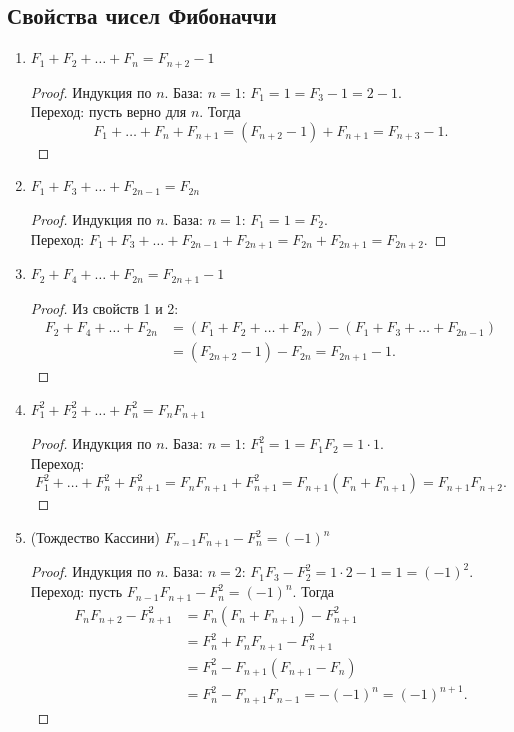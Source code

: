 \documentclass[12pt]{article}
\begin{document}
	\subsection{Свойства чисел Фибоначчи}
	
	\begin{enumerate}
		\item $F_1 + F_2 + \dots + F_n = F_{n + 2} - 1$
		
		\begin{proof}
			Индукция по $n$. База: $n = 1$: $F_1 = 1 = F_3 - 1 = 2 - 1$. \\
			Переход: пусть верно для $n$. Тогда
			\[F_1 + \dots + F_n + F_{n+1} = (F_{n+2} - 1) + F_{n+1} = F_{n+3} - 1.\]
		\end{proof}
		
		\item $F_1 + F_3 + \dots + F_{2n - 1} = F_{2n}$
		
		\begin{proof}
			Индукция по $n$. База: $n = 1$: $F_1 = 1 = F_2$. \\
			Переход: $F_1 + F_3 + \dots + F_{2n-1} + F_{2n+1} = F_{2n} + F_{2n+1} = F_{2n+2}$.
		\end{proof}
		
		\item $F_2 + F_4 + \dots + F_{2n} = F_{2n + 1} - 1$
		
		\begin{proof}
			Из свойств 1 и 2: 
			\begin{align*}
				F_2 + F_4 + \dots + F_{2n} &= (F_1 + F_2 + \dots + F_{2n}) - (F_1 + F_3 + \dots + F_{2n-1}) \\
				&= (F_{2n+2} - 1) - F_{2n} = F_{2n+1} - 1.
			\end{align*}
		\end{proof}
		
		\item $F_1^2 + F_2^2 + \dots + F_n^2 = F_n F_{n + 1}$
		
		\begin{proof}
			Индукция по $n$. База: $n = 1$: $F_1^2 = 1 = F_1 F_2 = 1 \cdot 1$. \\
			Переход: 
			\[F_1^2 + \dots + F_n^2 + F_{n+1}^2 = F_n F_{n+1} + F_{n+1}^2 = F_{n+1}(F_n + F_{n+1}) = F_{n+1} F_{n+2}.\]
		\end{proof}
		
		\item (Тождество Кассини) $F_{n - 1} F_{n + 1} - F_n^2 = (-1)^n$
		
		\begin{proof}
			Индукция по $n$. База: $n = 2$: $F_1 F_3 - F_2^2 = 1 \cdot 2 - 1 = 1 = (-1)^2$. \\
			Переход: пусть $F_{n-1} F_{n+1} - F_n^2 = (-1)^n$. Тогда
			\begin{align*}
				F_n F_{n+2} - F_{n+1}^2 &= F_n(F_n + F_{n+1}) - F_{n+1}^2 \\
				&= F_n^2 + F_n F_{n+1} - F_{n+1}^2 \\
				&= F_n^2 - F_{n+1}(F_{n+1} - F_n) \\
				&= F_n^2 - F_{n+1} F_{n-1} = -(-1)^n = (-1)^{n+1}.
			\end{align*}
		\end{proof}
		

\end{enumerate}
\end{document}
